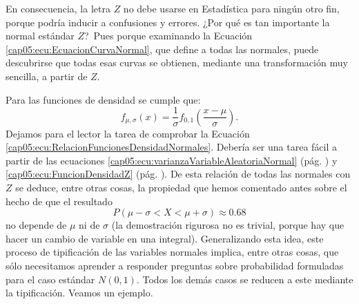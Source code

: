 En consecuencia, la letra $Z$ no debe usarse en Estadística para ningún otro fin, porque podría inducir a confusiones y errores. ¿Por qué es tan importante la normal estándar $Z$? \,Pues porque examinando la Ecuación \ref{cap05:ecu:EcuacionCurvaNormal}, que define a todas las normales, puede descubrirse que todas esas curvas se obtienen, mediante una transformación muy sencilla, a partir de $Z$.
    \begin{center}
    \end{center}
Para las funciones de densidad se cumple que:
    \begin{equation}\label{cap05:ecu:RelacionFuncionesDensidadNormales}
    f_{\mu,\sigma}(x)=\dfrac{1}{\sigma}f_{0,1}\left(\dfrac{x-\mu}{\sigma}\right).
    \end{equation}
Dejamos para el lector la tarea de comprobar la Ecuación \ref{cap05:ecu:RelacionFuncionesDensidadNormales}. Debería ser una tarea fácil a partir de las ecuaciones \ref{cap05:ecu:varianzaVariableAleatoriaNormal} (pág. \pageref{cap05:ecu:varianzaVariableAleatoriaNormal}) y \ref{cap05:ecu:FuncionDensidadZ} (pág. \pageref{cap05:ecu:FuncionDensidadZ}). De esta relación de todas las normales con $Z$ se deduce, entre otras cosas, la propiedad que hemos comentado antes sobre el hecho de que el resultado
    \[P(\mu-\sigma<X<\mu+\sigma)\approx 0.68\]
no depende de $\mu$ ni de $\sigma$ (la demostración rigurosa no es trivial, porque hay que hacer un cambio de variable en una integral). Generalizando esta idea, este proceso de tipificación de las variables normales implica, entre otras cosas, que sólo necesitamos aprender a responder preguntas sobre probabilidad formuladas para el caso estándar $N(0,1)$. Todos los demás casos se reducen a este mediante la tipificación. Veamos un ejemplo.
